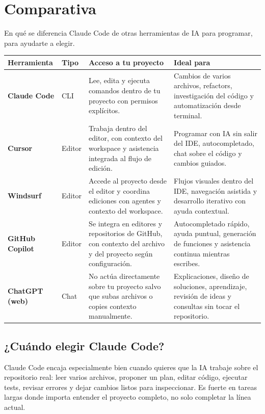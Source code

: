 \documentclass[11pt,a4paper]{report}
\begin{document}
\chapter{Comparativa}

En qué se diferencia Claude Code de otras herramientas de IA para programar, para ayudarte a elegir.

\begin{longtable}{>{\raggedright\arraybackslash}p{}>{\raggedright\arraybackslash}p{}>{\raggedright\arraybackslash}p{}>{\raggedright\arraybackslash}p{}}
\toprule
Herramienta & Tipo & Acceso a tu proyecto & Ideal para \\\midrule
\textbf{Claude Code} & CLI & Lee, edita y ejecuta comandos dentro de tu proyecto con permisos explícitos. & Cambios de varios archivos, refactors, investigación del código y automatización desde terminal. \\
\textbf{Cursor} & Editor & Trabaja dentro del editor, con contexto del workspace y asistencia integrada al flujo de edición. & Programar con IA sin salir del IDE, autocompletado, chat sobre el código y cambios guiados. \\
\textbf{Windsurf} & Editor & Accede al proyecto desde el editor y coordina ediciones con agentes y contexto del workspace. & Flujos visuales dentro del IDE, navegación asistida y desarrollo iterativo con ayuda contextual. \\
\textbf{GitHub Copilot} & Editor & Se integra en editores y repositorios de GitHub, con contexto del archivo y del proyecto según configuración. & Autocompletado rápido, ayuda puntual, generación de funciones y asistencia continua mientras escribes. \\
\textbf{ChatGPT (web)} & Chat & No actúa directamente sobre tu proyecto salvo que subas archivos o copies contexto manualmente. & Explicaciones, diseño de soluciones, aprendizaje, revisión de ideas y consultas sin tocar el repositorio. \\
\bottomrule
\end{longtable}

\section{¿Cuándo elegir Claude Code?}

Claude Code encaja especialmente bien cuando quieres que la IA trabaje sobre el repositorio real: leer varios archivos, proponer un plan, editar código, ejecutar tests, revisar errores y dejar cambios listos para inspeccionar. Es fuerte en tareas largas donde importa entender el proyecto completo, no solo completar la línea actual.
\end{document}
